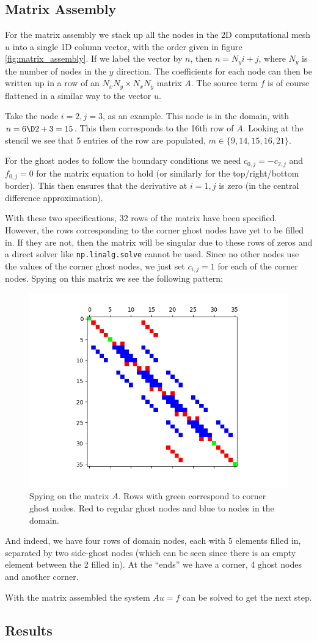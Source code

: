 \documentclass[sigconf]{acmart}
\begin{document}
\subsection{Matrix Assembly}
For the matrix assembly we stack up all the nodes in the 2D computational mesh $ u $ into a single 1D column vector, with the order given in figure \ref{fig:matrix_assembly}. If we label the vector by $ n $, then $ n = N_y i + j $, where $ N_y $ is the number of nodes in the $ y $ direction. The coefficients for each node can then be written up in a row of an $ N_xN_y \times N_x N_y $ matrix $ A $. The source term $ f $ is of course flattened in a similar way to the vector $ u $.

Take the node $ i=2, j=3 $, as an example. This node is in the domain, with $ n=6\D2+3 = 15 $. This then corresponds to the 16th row of $ A $. Looking at the stencil we see that 5 entries of the row are populated, $ m \in \{9, 14, 15, 16, 21\} $.

For the ghost nodes to follow the boundary conditions we need $ c_{0,j} = - c_{2,j} $ and $ f_{0,j}=0 $ for the matrix equation to hold (or similarly for the top/right/bottom border). This then ensures that the derivative at $ i=1, j $ is zero (in the central difference approximation).

With these two specifications, 32 rows of the matrix have been specified. However, the rows corresponding to the corner ghost nodes have yet to be filled in. If they are not, then the matrix will be singular due to these rows of zeros and a direct solver like \texttt{np.linalg.solve} cannot be used. Since no other nodes use the values of the corner ghost nodes, we just set $ c_{i,j} = 1 $ for each of the corner nodes. Spying on this matrix we see the following pattern:
\begin{figure}[H]
	\centering
	\includegraphics[width=\linewidth]{spy.png}
	\caption{Spying on the matrix $ A $. Rows with green correspond to corner ghost nodes. Red to regular ghost nodes and blue to nodes in the domain.}
\end{figure}
And indeed, we have four rows of domain nodes, each with 5 elements filled in, separated by two side-ghost nodes (which can be seen since there is an empty element between the 2 filled in). At the ``ends'' we have a corner, 4 ghost nodes and another corner.

With the matrix assembled the system $ Au=f $ can be solved to get the next step.

\subsection{Results}
\end{document}
